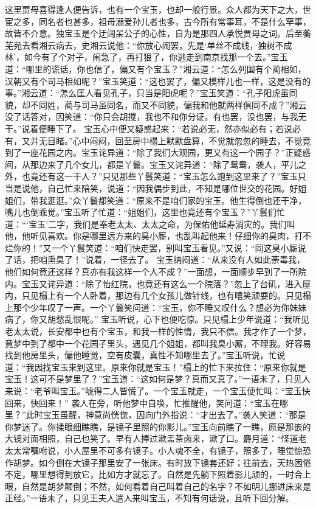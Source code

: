 \documentclass[12pt,oneside]{book}
\begin{document}
这里贾母喜得逢人便告诉，也有一个宝玉，也却一般行景。众人都为天下之大，世宦之多，同名者也甚多，祖母溺爱孙儿者也多，古今所有常事耳，不是什么罕事，故皆不介意。独宝玉是个迂阔呆公子的心性，自为是那四人承悦贾母之词。后至蘅芜苑去看湘云病去，史湘云说他：“你放心闹罢，先是‘单丝不成线，独树不成林’，如今有了个对子，闹急了，再打狠了，你逃走到南京找那一个去。”宝玉道：“哪里的谎话，你也信了，偏又有个宝玉？”湘云道：“怎么列国有个蔺相如，汉朝又有个司马相如呢？”宝玉笑道：“这也罢了，偏又模样儿也一样，这是没有的事。”湘云道：“怎么匡人看见孔子，只当是阳虎呢？”宝玉笑道：“孔子阳虎虽同貌，却不同姓，蔺与司马虽同名，而又不同貌，偏我和他就两样俱同不成？”湘云没了话答对，因笑道：“你只会胡搅，我也不和你分证。有也罢，没也罢，与我无干。”说着便睡下了。
宝玉心中便又疑惑起来：“若说必无，然亦似必有；若说必有，又并无目睹。”心中闷闷，回至房中榻上默默盘算，不觉就忽忽的睡去，不觉竟到了一座花园之内。宝玉诧异道：“除了我们大观园，更又有这一个园子？”正疑惑间，从那边来了几个女儿，都是丫鬟。宝玉又诧异道：“除了鸳鸯，袭人，平儿之外，也竟还有这一干人？”只见那些丫鬟笑道：“宝玉怎么跑到这里来了？”宝玉只当是说他，自己忙来陪笑，说道：“因我偶步到此，不知是哪位世交的花园。好姐姐们，带我逛逛。”众丫鬟都笑道：“原来不是咱们家的宝玉。他生得倒也还干净，嘴儿也倒乖觉。”宝玉听了忙道：“姐姐们，这里也竟还有个宝玉？”丫鬟们忙道：“‘宝玉’二字，我们是奉老太太、太太之命，为保佑他延寿消灾的。我们叫他，他听见喜欢。你是哪里远方来的臭小厮，也乱叫起他来！仔细你的臭肉，打不烂你的！”又一个丫鬟笑道：“咱们快走罢，别叫宝玉看见。”又说：“同这臭小厮说了话，把咱熏臭了！”说着，一径去了。
宝玉纳闷道：“从来没有人如此荼毒我，他们如何竟还这样？真亦有我这样一个人不成？”一面想，一面顺步早到了一所院内。宝玉又诧异道：“除了怡红院，也竟还有这么一个院落？”忽上了台矶，进入屋内，只见榻上有一个人卧着，那边有几个女孩儿做针线，也有嘻笑顽耍的。只见榻上那个少年叹了一声。一个丫鬟笑问道：“宝玉，你不睡又叹什么？想必为你妹妹病了，你又胡愁乱恨呢。”
宝玉听说，心下也便吃惊。只见榻上少年说道：“我听见老太太说，长安都中也有个宝玉，和我一样的性情，我只不信。我才作了一个梦，竟梦中到了都中一个花园子里头，遇见几个姐姐，都叫我臭小厮，不理我。好容易找到他房里头，偏他睡觉，空有皮囊，真性不知哪里去了。”宝玉听说，忙说道：“我因找宝玉来到这里。原来你就是宝玉！”榻上的忙下来拉住：“原来你就是宝玉！这可不是梦里了？”宝玉道：“这如何是梦？真而又真了。”一语未了，只见人来说：“老爷叫宝玉。”唬得二人皆慌了。一个宝玉就走，一个宝玉便忙叫：“宝玉快回来，快回来！”
袭人在旁，听他梦中自唤，忙推醒他，笑问道：“宝玉在哪里？”此时宝玉虽醒，神意尚恍惚，因向门外指说：“才出去了。”袭人笑道：“那是你梦迷了。你揉眼细瞧瞧，是镜子里照的你影儿。”宝玉向前瞧了一瞧，原是那嵌的大镜对面相照，自己也笑了。早有人捧过漱盂茶卤来，漱了口。麝月道：“怪道老太太常嘱咐说，小人屋里不可多有镜子。小人魂不全，有镜子，照多了，睡觉惊恐作胡梦。如今倒在大镜子那里安了一张床。有时放下镜套还好；往前去，天热困倦不定，哪里想得到放它，比如方才就忘了。自然是先躺下照着影儿顽的，一时合上眼，自然是胡梦颠倒；不然，如何看着自己叫着自己的名字？不如明儿挪进床来是正经。”一语未了，只见王夫人遣人来叫宝玉，不知有何话说，且听下回分解。
\end{document}
